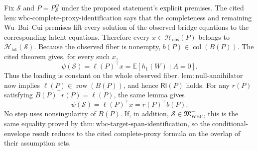 Fix \(\mathcal S\) and \(P=P_{\mathcal S}^O\) under the proposed statement's
explicit premises.  The cited
\(\mathrm{lem{:}wbc\text{-}complete\text{-}proxy\text{-}identification}\) says
that the completeness and remaining Wu--Bai--Cui premises lift every solution of
the observed bridge equations to the corresponding latent equations.  Therefore
every \(x\in\mathcal H_{\mathrm{obs}}(P)\) belongs to
\(\mathcal H_{\mathrm{lat}}(\mathcal S)\).  Because the observed fiber is
nonempty, \(b(P)\in\operatorname{col}(B(P))\).  The cited theorem gives, for
every such \(x\),
\[
 \psi(\mathcal S)=\ell(P)^\top x
 =\mathbb E[h_1(W)\mid A=0].
\]
Thus the loading is constant on the whole observed fiber.
\(\mathrm{lem{:}null\text{-}annihilator}\) now implies
\(\ell(P)\in\operatorname{row}(B(P))\), and hence
\(\mathsf{RI}(P)\) holds.  For any \(r(P)\) satisfying
\(B(P)^\top r(P)=\ell(P)\), the same lemma gives
\[
 \psi(\mathcal S)=\ell(P)^\top x=r(P)^\top b(P).
\]
No step uses nonsingularity of \(B(P)\).  If, in addition,
\(\mathcal S\in\mathfrak M_{\mathrm{WBC}}^+\), this is the same equality proved
by \(\mathrm{thm{:}wbc\text{-}target\text{-}span\text{-}identification}\), so
the conditional-envelope result reduces to the cited complete-proxy formula on
the overlap of their assumption sets.